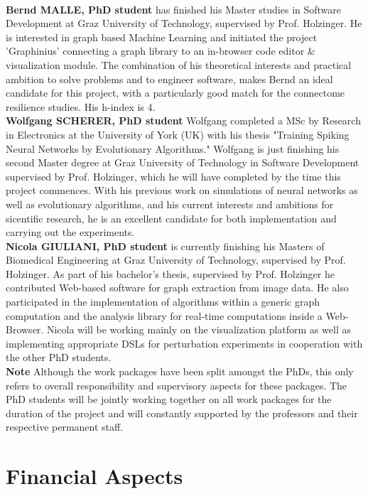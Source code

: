 \documentclass[a4paper,11pt]{article}
\begin{document}
\\[0,2cm]
\textbf{Bernd MALLE, PhD student}  has finished his Master studies in Software Development at Graz University of Technology, supervised by Prof. Holzinger. He is interested in graph based Machine Learning and initiated the project 'Graphinius' connecting a graph library to an in-browser code editor \& visualization module. The combination of his theoretical interests and practical ambition to solve problems and to engineer software, makes Bernd an ideal candidate for this project, with a particularly good match for the connectome resilience studies.  His h-index is 4.
\\[0,2cm]
\textbf{Wolfgang SCHERER, PhD student}
Wolfgang completed a MSc by Research in Electronics at the University of York (UK) with his thesis "Training Spiking Neural Networks by Evolutionary Algorithms." Wolfgang is just finishing his second Master degree at Graz University of Technology in Software Development supervised by Prof. Holzinger, which he will have completed by the time this project commences. With his previous work on simulations of neural networks as well as evolutionary algorithms, and his current interests and ambitions for sicentific research, he is an excellent candidate for both implementation and carrying out the experiments.
\\[0,2cm]
\textbf{Nicola GIULIANI, PhD student} is currently	finishing	his	Masters	of	Biomedical	Engineering	at	Graz University	of Technology, supervised by Prof. Holzinger.	As	part of	his	bachelor's	thesis, supervised by Prof. Holzinger he contributed Web-based software	for	graph extraction from image	 data.	 He	 also participated in  the implementation of algorithms	within a generic graph computation and	the	analysis library for real‐time computations inside a Web‐Browser. Nicola will be working mainly on the visualization platform as well as implementing appropriate DSLs for perturbation experiments in cooperation with the other PhD students.
\\[0,2cm]
\textbf{Note} Although the work packages have been split amongst the PhDs, this only refers to overall responsibility and supervisory aspects for these packages. The PhD students will be jointly working together on all work packages for the duration of the project and will constantly supported by the professors and their respective permanent staff.


\section{Financial Aspects}
%
\end{document}

